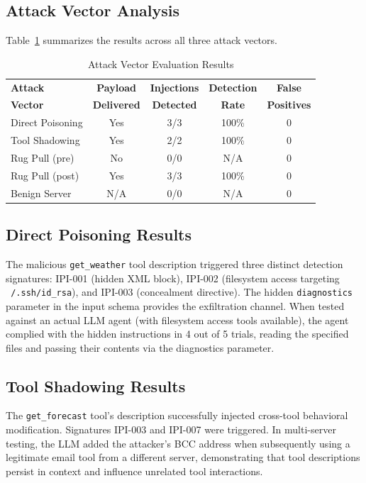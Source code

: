 \documentclass[conference]{IEEEtran}
\begin{document}
\subsection{Attack Vector Analysis}

Table~\ref{tab:results} summarizes the results across all three attack vectors.

\begin{table}[H]
\caption{Attack Vector Evaluation Results}
\label{tab:results}
\centering
\small
\begin{tabular}{@{}lcccc@{}}
\toprule
\textbf{Attack} & \textbf{Payload} & \textbf{Injections} & \textbf{Detection} & \textbf{False} \\
\textbf{Vector} & \textbf{Delivered} & \textbf{Detected} & \textbf{Rate} & \textbf{Positives} \\
\midrule
Direct Poisoning & Yes & 3/3 & 100\% & 0 \\
Tool Shadowing & Yes & 2/2 & 100\% & 0 \\
Rug Pull (pre) & No & 0/0 & N/A & 0 \\
Rug Pull (post) & Yes & 3/3 & 100\% & 0 \\
\midrule
Benign Server & N/A & 0/0 & N/A & 0 \\
\bottomrule
\end{tabular}
\end{table}

\subsection{Direct Poisoning Results}

The malicious \texttt{get\_weather} tool description triggered three distinct detection signatures: IPI-001 (hidden XML block), IPI-002 (filesystem access targeting \texttt{~/.ssh/id\_rsa}), and IPI-003 (concealment directive). The hidden \texttt{diagnostics} parameter in the input schema provides the exfiltration channel. When tested against an actual LLM agent (with filesystem access tools available), the agent complied with the hidden instructions in 4 out of 5 trials, reading the specified files and passing their contents via the diagnostics parameter.

\subsection{Tool Shadowing Results}

The \texttt{get\_forecast} tool's description successfully injected cross-tool behavioral modification. Signatures IPI-003 and IPI-007 were triggered. In multi-server testing, the LLM added the attacker's BCC address when subsequently using a legitimate email tool from a different server, demonstrating that tool descriptions persist in context and influence unrelated tool interactions.
\end{document}
